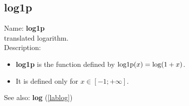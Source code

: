 \subsection{log1p}
\label{lablog1p}
\noindent Name: \textbf{log1p}\\
translated logarithm.\\

\noindent Description: \begin{itemize}

\item \textbf{log1p} is the function defined by ${\rm log1p}(x) = \log(1+x)$.

\item It is defined only for $x \in [-1; +\infty]$.
\end{itemize}
See also: \textbf{log} (\ref{lablog})
